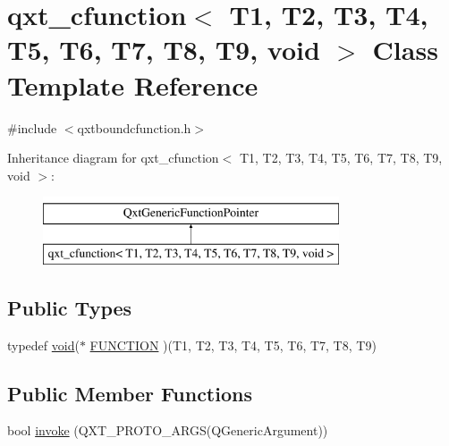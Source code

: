 \hypertarget{classqxt__cfunction_3_01_t1_00_01_t2_00_01_t3_00_01_t4_00_01_t5_00_01_t6_00_01_t7_00_01_t8_00_01_t9_00_01void_01_4}{\section{qxt\-\_\-cfunction$<$ T1, T2, T3, T4, T5, T6, T7, T8, T9, void $>$ Class Template Reference}
\label{classqxt__cfunction_3_01_t1_00_01_t2_00_01_t3_00_01_t4_00_01_t5_00_01_t6_00_01_t7_00_01_t8_00_01_t9_00_01void_01_4}
}


{\ttfamily \#include $<$qxtboundcfunction.\-h$>$}

Inheritance diagram for qxt\-\_\-cfunction$<$ T1, T2, T3, T4, T5, T6, T7, T8, T9, void $>$\-:\begin{figure}[H]
\begin{center}
\leavevmode
\includegraphics[height=2.000000cm]{classqxt__cfunction_3_01_t1_00_01_t2_00_01_t3_00_01_t4_00_01_t5_00_01_t6_00_01_t7_00_01_t8_00_01_t9_00_01void_01_4}
\end{center}
\end{figure}
\subsection*{Public Types}
\begin{DoxyCompactItemize}
\item 
typedef \hyperlink{group___u_a_v_objects_plugin_ga444cf2ff3f0ecbe028adce838d373f5c}{void}($\ast$ \hyperlink{classqxt__cfunction_3_01_t1_00_01_t2_00_01_t3_00_01_t4_00_01_t5_00_01_t6_00_01_t7_00_01_t8_00_01_t9_00_01void_01_4_a9bbc92788fe93f2612ab8658a78a8769}{F\-U\-N\-C\-T\-I\-O\-N} )(T1, T2, T3, T4, T5, T6, T7, T8, T9)
\end{DoxyCompactItemize}
\subsection*{Public Member Functions}
\begin{DoxyCompactItemize}
\item 
bool \hyperlink{classqxt__cfunction_3_01_t1_00_01_t2_00_01_t3_00_01_t4_00_01_t5_00_01_t6_00_01_t7_00_01_t8_00_01_t9_00_01void_01_4_a45de69f13536ed5339b3dbaf6457aa88}{invoke} (Q\-X\-T\-\_\-\-P\-R\-O\-T\-O\-\_\-A\-R\-G\-S(Q\-Generic\-Argument))
\end{DoxyCompactItemize}
